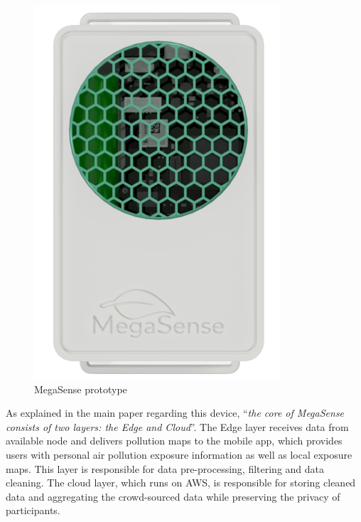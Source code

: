 			\noindent
			\begin{minipage}{0.35\textwidth}
				\begin{figure}[H]
					\centering
					\includegraphics[width=.8\textwidth]{resources/img/chap2/megasense}
					\caption{MegaSense prototype}
					\label{img:megasense_picture}
				\end{figure}
			\end{minipage}%
			\hfill%
			\begin{minipage}{0.65\textwidth}\raggedright
				As explained in the main paper \cite{megasense} regarding this device, ``\textit{the core of MegaSense consists of two layers: the Edge and Cloud}''.
				The Edge layer receives data from available node and delivers pollution maps to the mobile app, which provides users with personal air pollution exposure	information as well as local exposure maps.
				This layer is responsible for data pre-processing, filtering and data cleaning.
				The cloud layer, which runs on AWS, is responsible for storing cleaned data	and aggregating the crowd-sourced data while preserving the privacy of participants.
			\end{minipage}
			\newline

